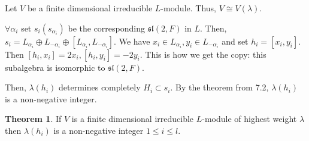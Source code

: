 \documentclass{article}
\theoremstyle{definition}
\newtheorem{theorem}{Theorem}
\begin{document}
    Let \(V\) be a finite dimensional irreducible \(L\)-module. Thus, \(V\cong V(\lambda)\).

    \(\forall \alpha_i\) set \(s_i (s_{\alpha_i})\) be the corresponding \(\mathfrak{sl}(2,F)\) in \(L\). Then, \(s_i = L_{\alpha_i} \oplus L_{-\alpha_i} \oplus [L_{\alpha_i}, L_{-\alpha_i}]\). We have \(x_i \in L_{\alpha_i}, y_i \in L_{-\alpha_i}\) and set \(h_i = [x_i, y_i]\). Then \([h_i, x_i] = 2x_i, [h_i, y_i]=-2y_i\). This is how we get the copy: this subalgebra is isomorphic to \(\mathfrak{sl}(2,F)\).
    
    Then, \(\lambda(h_i)\) determines completely \(H_i \subset s_i\). By the theorem from 7.2, \(\lambda(h_i)\) is a non-negative integer.
    
    \begin{theorem}
        If \(V\) is a finite dimensional irreducible \(L\)-module of highest weight \(\lambda\) then \(\lambda(h_i)\) is a non-negative integer \(1 \leq i \leq l\).
    \end{theorem}

    
\end{document}
